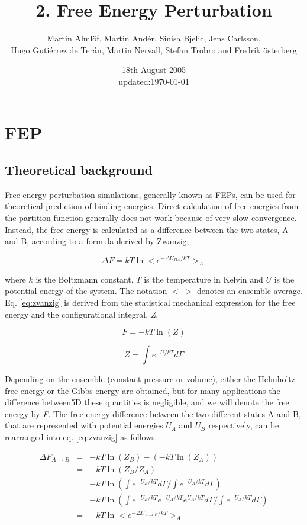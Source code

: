 \documentclass[a4paper,12pt]{article}
\author{Martin Alml\"of, Martin And\'er, Sinisa Bjelic, Jens Carlsson, \\
Hugo Guti\'errez de Ter\'an, Martin Nervall, Stefan Trobro and
Fredrik \"osterberg}
\date{18th August 2005 \\ \footnotesize{updated:\today}}
\title{2. Free Energy Perturbation
}
\begin{document}
\maketitle
\tableofcontents
\newpage

\renewcommand{\thefigure}{\arabic{figure}}

\section{FEP}
\subsection{Theoretical background}
Free energy perturbation simulations, generally known as FEPs, can be
used for theoretical prediction of binding energies. Direct
calculation of free energies from the partition function generally does not
work because of very slow convergence. Instead, the free energy is calculated as a
difference between the two states, A and B, according to a formula derived by Zwanzig,

\begin{equation}
\label{eq:zvanzig}
  \Delta F=kT\ln <e^{-\Delta U_{BA}/kT}>_A
\end{equation}

\noindent where $k$ is the Boltzmann constant, $T$ is the
temperature in Kelvin and $U$ is the potential energy of the
system. The notation $<\cdot>$ denotes an ensemble average. Eq.
\ref{eq:zvanzig} is derived from the statistical mechanical
expression for the free energy and the configurational integral, \textit Z.

\begin{equation}
\label{eq:s.m.h.}
  F=-kT\ln(Z)
\end{equation}

\begin{equation}
\label{eq:conf}
  Z=\int e^{-U/kT} d \Gamma
\end{equation}

\noindent Depending on the ensemble (constant pressure or volume), either the Helmholtz free
energy or the Gibbs energy are obtained, but for many applications the difference between5D
these quantities is negligible, and we will denote the free energy
by \textit F. The free energy difference between the two different
states A and B, that are represented with potential energies $U_A$
and $U_B$ respectively, can be rearranged into eq.
\ref{eq:zvanzig} as follows

\begin{eqnarray}
  \nonumber \Delta F_{A \rightarrow B}&=&-kT\ln(Z_B)-(-kT\ln(Z_A))\\
  \nonumber &=& -kT\ln(Z_B/Z_A)\\
             &=& -kT\ln(\int e^{-U_B/kT} d \Gamma/\int e^{-U_A/kT} d \Gamma)\\
  \nonumber &=& -kT\ln(\int e^{-U_B/kT}e^{-U_A/kT}e^{U_A/kT} d \Gamma/\int e^{-U_A/kT} d \Gamma)\\
  \nonumber &=& -kT\ln<e^{-\Delta U_{A \rightarrow B}/kT}>_A
\end{eqnarray}
\end{document}
